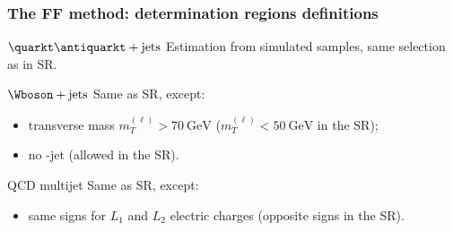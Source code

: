 %

\begin{frame}
\frametitle{The FF method: determination regions definitions}

\begin{block}{$\quarkt\antiquarkt+\text{jets}$}
Estimation from simulated samples, same selection as in SR.
\end{block}

\pause\vfill

\begin{block}{$\Wboson+\text{jets}$}
Same as SR, except:
\begin{itemize}
\item transverse mass $m_T^{(\ell)}>\SI{70}{\GeV}$ ($m_T^{(\ell)}<\SI{50}{\GeV}$ in the SR);
\item no \quarkb-jet (allowed in the SR).
\end{itemize}
\end{block}

\pause\vfill

\begin{block}{QCD multijet}
Same as SR, except:
\begin{itemize}
\item same signs for $L_1$ and $L_2$ electric charges (opposite signs in the SR).
\end{itemize}
\end{block}

\end{frame}


